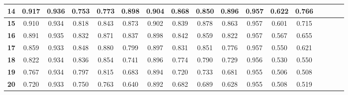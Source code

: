 \begin{table*}[!t]
\begin{tabular}{|c|c|c|c|c|c|c|c|c|c|c|c|c|c|c|c|c|}
\hline
\bfseries 14 & 0.917 & 0.936 & 0.753 & 0.773 & 0.898 & 0.904 & 0.868 & 0.850 & 0.896 & 0.957 & 0.622 & 0.766 \\
\hline
\bfseries 15 & 0.910 & 0.934 & 0.818 & 0.843 & 0.873 & 0.902 & 0.839 & 0.878 & 0.863 & 0.957 & 0.601 & 0.715 \\
\hline
\bfseries 16 & 0.891 & 0.935 & 0.832 & 0.871 & 0.837 & 0.898 & 0.842 & 0.859 & 0.822 & 0.957 & 0.567 & 0.655 \\
\hline
\bfseries 17 & 0.859 & 0.933 & 0.848 & 0.880 & 0.799 & 0.897 & 0.831 & 0.851 & 0.776 & 0.957 & 0.550 & 0.621 \\
\hline
\bfseries 18 & 0.822 & 0.934 & 0.836 & 0.854 & 0.741 & 0.896 & 0.774 & 0.790 & 0.729 & 0.956 & 0.530 & 0.550 \\
\hline
\bfseries 19 & 0.767 & 0.934 & 0.797 & 0.815 & 0.683 & 0.894 & 0.720 & 0.733 & 0.681 & 0.955 & 0.506 & 0.508 \\
\hline
\bfseries 20 & 0.720 & 0.933 & 0.750 & 0.763 & 0.640 & 0.892 & 0.682 & 0.689 & 0.628 & 0.955 & 0.508 & 0.519 \\
\hline
\end{tabular}
\end{table*}

